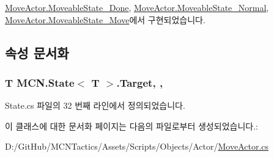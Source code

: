 \hyperlink{class_move_actor_1_1_moveable_state___done_a5fa0f074185fecf42c07697b3bf9ab2c}{Move\+Actor.\+Moveable\+State\+\_\+\+Done}, \hyperlink{class_move_actor_1_1_moveable_state___normal_a687176bd566ec3493d38fb51d6f5de5f}{Move\+Actor.\+Moveable\+State\+\_\+\+Normal}, \hyperlink{class_move_actor_1_1_moveable_state___move_a81659255954f8ff95fcac87a0cfd3c73}{Move\+Actor.\+Moveable\+State\+\_\+\+Move}에서 구현되었습니다.



\subsection{속성 문서화}
\subsubsection[{\texorpdfstring{Target}{Target}}]{\setlength{\rightskip}{0pt plus 5cm}T {\bf M\+C\+N.\+State}$<$ T $>$.Target\hspace{0.3cm}{\ttfamily [get]}, {\ttfamily [protected]}, {\ttfamily [inherited]}}\hypertarget{class_m_c_n_1_1_state_a93ba2fd920292031bd6e65b1dc505cb3}{}\label{class_m_c_n_1_1_state_a93ba2fd920292031bd6e65b1dc505cb3}


State.\+cs 파일의 32 번째 라인에서 정의되었습니다.



이 클래스에 대한 문서화 페이지는 다음의 파일로부터 생성되었습니다.\+:\begin{DoxyCompactItemize}
\item 
D\+:/\+Git\+Hub/\+M\+C\+N\+Tactics/\+Assets/\+Scripts/\+Objects/\+Actor/\hyperlink{_move_actor_8cs}{Move\+Actor.\+cs}\end{DoxyCompactItemize}
